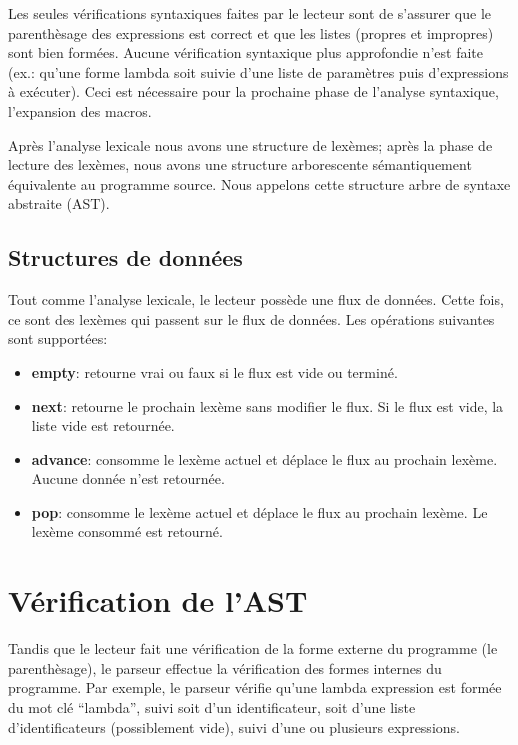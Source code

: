 \documentclass[10pt]{report}
\begin{document}
Les seules vérifications syntaxiques faites par le lecteur sont de s'assurer
que le parenthèsage des expressions est correct et que les listes (propres et
impropres) sont bien formées.  Aucune vérification syntaxique plus approfondie
n'est faite (ex.: qu'une forme lambda soit suivie d'une liste de paramètres
puis d'expressions à exécuter).  Ceci est nécessaire pour la prochaine phase
de l'analyse syntaxique, l'expansion des macros.

Après l'analyse lexicale nous avons une structure de lexèmes; après la phase
de lecture des lexèmes, nous avons une structure arborescente sémantiquement
équivalente au programme source. Nous appelons cette structure arbre de
syntaxe abstraite (AST).

\subsection{Structures de données}

Tout comme l'analyse lexicale, le lecteur possède une flux de
données.  Cette fois, ce sont des lexèmes qui passent sur le flux de
données.  Les opérations suivantes sont supportées:

\begin{itemize}
\item {\bf empty}: retourne vrai ou faux si le flux est vide ou terminé.
\item {\bf next}: retourne le prochain lexème sans modifier le flux.
  Si le flux est vide, la liste vide est retournée.
\item {\bf advance}: consomme le lexème actuel et déplace le flux au
  prochain lexème.  Aucune donnée n'est retournée.
\item {\bf pop}: consomme le lexème actuel et déplace le flux au
  prochain lexème.  Le lexème consommé est retourné.
\end{itemize}

\section{Vérification de l'AST}

Tandis que le lecteur fait une vérification de la forme externe du programme
(le parenthèsage), le parseur effectue la vérification des formes internes du
programme. Par exemple, le parseur vérifie qu'une lambda expression est formée
du mot clé ``lambda'', suivi soit d'un identificateur, soit d'une liste
d'identificateurs (possiblement vide), suivi d'une ou plusieurs expressions.
\end{document}
